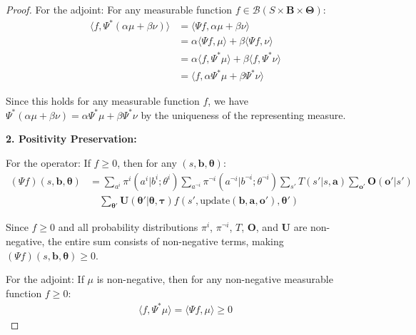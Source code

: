 \begin{proof}
    For the adjoint: For any measurable function
    $f \in \mathcal{B}(S \times \boldsymbol{B}\times \boldsymbol{\Theta})$:
    \begin{align}
        \langle f, \Psi^{*}(\alpha\mu + \beta\nu) \rangle & = \langle \Psi f, \alpha\mu + \beta\nu \rangle                               \\
                                                          & = \alpha\langle \Psi f, \mu \rangle + \beta\langle \Psi f, \nu \rangle       \\
                                                          & = \alpha\langle f, \Psi^{*}\mu \rangle + \beta\langle f, \Psi^{*}\nu \rangle \\
                                                          & = \langle f, \alpha\Psi^{*}\mu + \beta\Psi^{*}\nu \rangle
    \end{align}

    Since this holds for any measurable function $f$, we have $\Psi^{*}(\alpha\mu +
        \beta\nu) = \alpha\Psi^{*}\mu + \beta\Psi^{*}\nu$ by the uniqueness of the representing
    measure.

    \textbf{2. Positivity Preservation:}

    For the operator: If $f \geq 0$, then for any $(s, \boldsymbol{b}, \boldsymbol{\theta}
        )$:
    \begin{align}
        (\Psi f)(s, \boldsymbol{b}, \boldsymbol{\theta}) & = \sum_{a^i}\pi^{i}(a^{i}|b^{i}; \theta^{i}) \sum_{a^{\neg i}}\pi^{\neg i}(a^{\neg i}|b^{\neg i}; \theta^{\neg i}) \sum_{s'}T(s'|s, \boldsymbol{a}) \sum_{\boldsymbol{o}'}\boldsymbol{O}(\boldsymbol{o}'|s') \\
                                                         & \quad \sum_{\boldsymbol{\theta}'}\boldsymbol{U}(\boldsymbol{\theta}'|\boldsymbol{\theta}, \boldsymbol{\tau}) f(s', \text{update}(\boldsymbol{b}, \boldsymbol{a}, \boldsymbol{o}'), \boldsymbol{\theta}')
    \end{align}

    Since $f \geq 0$ and all probability distributions $\pi^{i}$, $\pi^{\neg i}$, $T$,
    $\boldsymbol{O}$, and $\boldsymbol{U}$ are non-negative, the entire sum
    consists of non-negative terms, making $(\Psi f)(s, \boldsymbol{b}, \boldsymbol
        {\theta}) \geq 0$.

    For the adjoint: If $\mu$ is non-negative, then for any non-negative measurable
    function $f \geq 0$:
    \begin{align}
        \langle f, \Psi^{*}\mu \rangle = \langle \Psi f, \mu \rangle \geq 0
    \end{align}


\end{proof}
